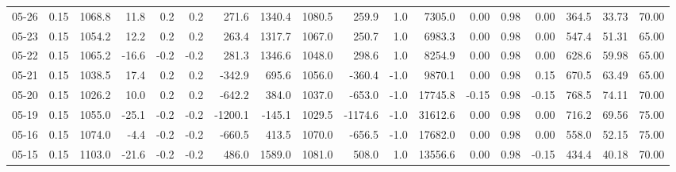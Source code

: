 \begin{threeparttable}
{\begin{tabular}{lrrrrrrrrrrrrrrrrr}
  05-26 &     0.15 & 1068.8 &              11.8 &               0.2 &                0.2 &              271.6 & 1340.4 & 1080.5 &      259.9 &                      1.0 &              7305.0 &       0.00 &      0.98 &           0.00 &            364.5 &           33.73 &                  70.00 \\
  05-23 &     0.15 & 1054.2 &              12.2 &               0.2 &                0.2 &              263.4 & 1317.7 & 1067.0 &      250.7 &                      1.0 &              6983.3 &       0.00 &      0.98 &           0.00 &            547.4 &           51.31 &                  65.00 \\
  05-22 &     0.15 & 1065.2 &             -16.6 &              -0.2 &               -0.2 &              281.3 & 1346.6 & 1048.0 &      298.6 &                      1.0 &              8254.9 &       0.00 &      0.98 &           0.00 &            628.6 &           59.98 &                  65.00 \\
  05-21 &     0.15 & 1038.5 &              17.4 &               0.2 &                0.2 &             -342.9 &  695.6 & 1056.0 &     -360.4 &                     -1.0 &              9870.1 &       0.00 &      0.98 &           0.15 &            670.5 &           63.49 &                  65.00 \\
  05-20 &     0.15 & 1026.2 &              10.0 &               0.2 &                0.2 &             -642.2 &  384.0 & 1037.0 &     -653.0 &                     -1.0 &             17745.8 &      -0.15 &      0.98 &          -0.15 &            768.5 &           74.11 &                  70.00 \\
  05-19 &     0.15 & 1055.0 &             -25.1 &              -0.2 &               -0.2 &            -1200.1 & -145.1 & 1029.5 &    -1174.6 &                     -1.0 &             31612.6 &       0.00 &      0.98 &           0.00 &            716.2 &           69.56 &                  75.00 \\
  05-16 &     0.15 & 1074.0 &              -4.4 &              -0.2 &               -0.2 &             -660.5 &  413.5 & 1070.0 &     -656.5 &                     -1.0 &             17682.0 &       0.00 &      0.98 &           0.00 &            558.0 &           52.15 &                  75.00 \\
  05-15 &     0.15 & 1103.0 &             -21.6 &              -0.2 &               -0.2 &              486.0 & 1589.0 & 1081.0 &      508.0 &                      1.0 &             13556.6 &       0.00 &      0.98 &          -0.15 &            434.4 &           40.18 &                  70.00 \\

\end{tabular}}
\end{threeparttable}
